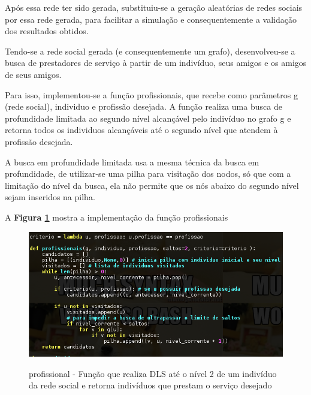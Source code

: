Após essa rede ter sido gerada, substituiu-se a geração aleatórias de redes sociais por essa rede gerada, para facilitar a simulação e consequentemente a validação dos resultados obtidos.

Tendo-se a rede social gerada (e consequentemente um grafo), desenvolveu-se a busca de prestadores de serviço à partir de um indivíduo, seus amigos e os amigos de seus amigos.

Para isso, implementou-se a função profissionais, que recebe como parâmetros g (rede social), individuo e profissão desejada. A função realiza uma busca de profundidade limitada ao segundo nível alcançável pelo indivíduo no grafo g e retorna todos os individuos alcançáveis até o segundo nível que atendem à profissão desejada.

A busca em profundidade limitada usa a mesma técnica da busca em profundidade, de utilizar-se uma pilha para visitação dos nodos, só que com a limitação do nível da busca, ela não permite que os nós abaixo do segundo nível sejam inseridos na pilha.

A \textbf{Figura \ref{fig:patoA}} mostra a implementação da função profissionais

\begin{figure}
	\centering
	\caption{profissional - Função que realiza DLS até o nível 2 de um indivíduo da rede social e retorna indivíduos que prestam o serviço desejado} 
	\includegraphics[scale=0.4]{./02-figuras/profissionais.png}
	\label{fig:patoA}
\end{figure}
